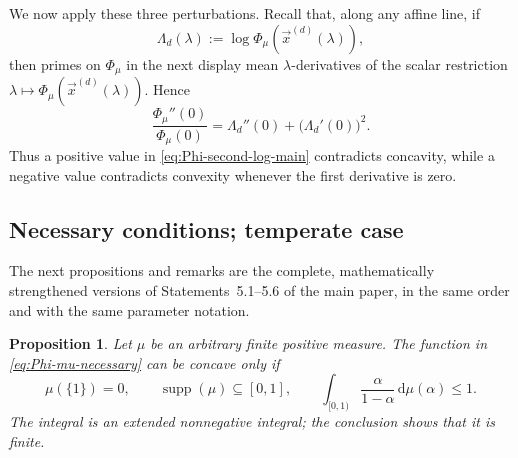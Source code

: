 \documentclass[aps,pra,11pt,onecolumn,nofootinbib,tightenlines]{revtex4-2}
\newtheorem{proposition}[theorem]{Proposition}
\theoremstyle{definition}
\begin{document}
We now apply these three perturbations. Recall that, along any affine line, if
\begin{equation}
 \Lambda_d(\lambda):=
 \log\Phi_\mu(\vec x^{(d)}(\lambda)),
 \label{eq:def-Lambda-d-main}
\end{equation}
then primes on $\Phi_\mu$ in the next display mean $\lambda$-derivatives of
the scalar restriction $\lambda\mapsto
\Phi_\mu(\vec x^{(d)}(\lambda))$.  Hence
\begin{equation}
 \frac{\Phi_\mu''(0)}{\Phi_\mu(0)}
 =\Lambda_d''(0)+\bigl(\Lambda_d'(0)\bigr)^2.
 \label{eq:Phi-second-log-main}
\end{equation}
Thus a positive value in \eqref{eq:Phi-second-log-main} contradicts concavity, while a negative value contradicts convexity whenever the first derivative is zero.

\subsection{Necessary conditions; temperate case}
\label{sec:temperate-necessity}

The next propositions and remarks are the complete, mathematically strengthened
versions of Statements~5.1--5.6 of the main paper, in the same order and with
the same parameter notation.

\begin{proposition}
\label{prop:positive-necessary}
Let $\mu$ be an arbitrary finite positive measure. The function in \eqref{eq:Phi-mu-necessary} can be concave only if
\begin{equation}
 \mu(\{1\})=0,
 \qquad
 \operatorname{supp}(\mu)\subseteq[0,1],
 \qquad
 \int_{[0,1)}\frac{\alpha}{1-\alpha}\,\mathrm d\mu(\alpha)
 \leq1.
 \label{eq:positive-necessary-condition}
\end{equation}
The integral is an extended nonnegative integral; the conclusion shows that it is finite.
\end{proposition}
\end{document}
